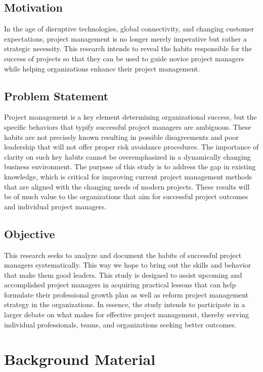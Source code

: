 \documentclass{article}
\begin{document}
\subsection{Motivation}
In the age of disruptive technologies, global connectivity, and changing customer expectations, project management is no longer merely imperative but rather a strategic necessity. This research intends to reveal the habits responsible for the success of projects so that they can be used to guide novice project managers while helping organizations enhance their project management.

\subsection{Problem Statement}
Project management is a key element determining organizational success, but the specific behaviors that typify successful project managers are ambiguous. These habits are not precisely known resulting in possible disagreements and poor leadership that will not offer proper risk avoidance procedures. The importance of clarity on such key habits cannot be overemphasized in a dynamically changing business environment. The purpose of this study is to address the gap in existing knowledge, which is critical for improving current project management methods that are aligned with the changing needs of modern projects. These results will be of much value to the organizations that aim for successful project outcomes and individual project managers.


\subsection{Objective}
This research seeks to analyze and document the habits of successful project managers systematically. This way we hope to bring out the skills and behavior that make them good leaders. This study is designed to assist upcoming and accomplished project managers in acquiring practical lessons that can help formulate their professional growth plan as well as reform project management strategy in the organizations. In essence, the study intends to participate in a larger debate on what makes for effective project management, thereby serving individual professionals, teams, and organizations seeking better outcomes.



\newpage
\section{Background Material}
\end{document}

